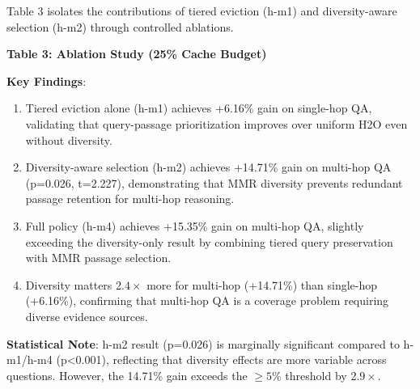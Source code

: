 Table 3 isolates the contributions of tiered eviction (h-m1) and diversity-aware selection (h-m2) through controlled ablations.

\textbf{Table 3: Ablation Study (25\% Cache Budget)}

\begin{table}[htbp]
\centering
{}
\end{table}

\textbf{Key Findings}:

\begin{enumerate}
\item Tiered eviction alone (h-m1) achieves +6.16\% gain on single-hop QA, validating that query-passage prioritization improves over uniform H2O even without diversity.
\item Diversity-aware selection (h-m2) achieves +14.71\% gain on multi-hop QA (p=0.026, t=2.227), demonstrating that MMR diversity prevents redundant passage retention for multi-hop reasoning.
\item Full policy (h-m4) achieves +15.35\% gain on multi-hop QA, slightly exceeding the diversity-only result by combining tiered query preservation with MMR passage selection.
\item Diversity matters 2.$4\times$ more for multi-hop (+14.71\%) than single-hop (+6.16\%), confirming that multi-hop QA is a coverage problem requiring diverse evidence sources.
\end{enumerate}

\textbf{Statistical Note}: h-m2 result (p=0.026) is marginally significant compared to h-m1/h-m4 (p<0.001), reflecting that diversity effects are more variable across questions. However, the 14.71\% gain exceeds the $\geq 5$\% threshold by 2.$9\times$.

